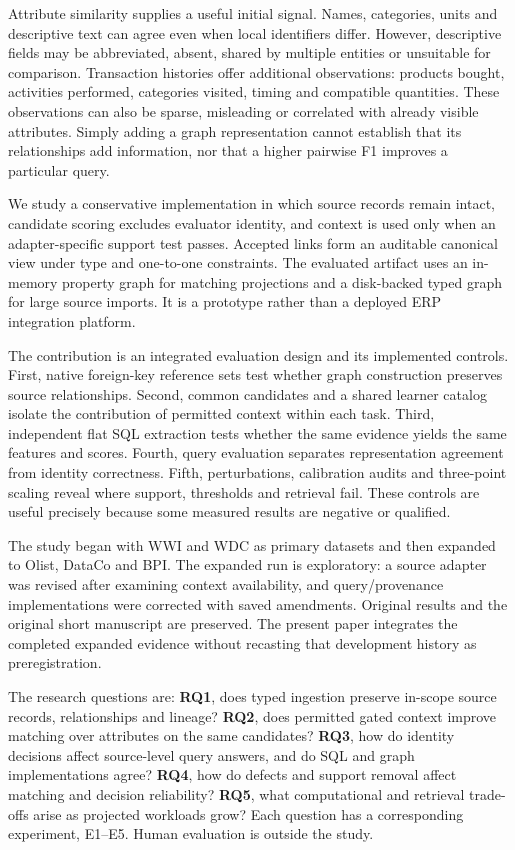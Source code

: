 \documentclass[11pt,letterpaper]{article}
\begin{document}
Attribute similarity supplies a useful initial signal. Names, categories, units and descriptive text can agree even when local identifiers differ. However, descriptive fields may be abbreviated, absent, shared by multiple entities or unsuitable for comparison. Transaction histories offer additional observations: products bought, activities performed, categories visited, timing and compatible quantities. These observations can also be sparse, misleading or correlated with already visible attributes. Simply adding a graph representation cannot establish that its relationships add information, nor that a higher pairwise F1 improves a particular query.

We study a conservative implementation in which source records remain intact, candidate scoring excludes evaluator identity, and context is used only when an adapter-specific support test passes. Accepted links form an auditable canonical view under type and one-to-one constraints. The evaluated artifact uses an in-memory property graph for matching projections and a disk-backed typed graph for large source imports. It is a prototype rather than a deployed ERP integration platform.

The contribution is an integrated evaluation design and its implemented controls. First, native foreign-key reference sets test whether graph construction preserves source relationships. Second, common candidates and a shared learner catalog isolate the contribution of permitted context within each task. Third, independent flat SQL extraction tests whether the same evidence yields the same features and scores. Fourth, query evaluation separates representation agreement from identity correctness. Fifth, perturbations, calibration audits and three-point scaling reveal where support, thresholds and retrieval fail. These controls are useful precisely because some measured results are negative or qualified.

The study began with WWI and WDC as primary datasets and then expanded to Olist, DataCo and BPI. The expanded run is exploratory: a source adapter was revised after examining context availability, and query/provenance implementations were corrected with saved amendments. Original results and the original short manuscript are preserved. The present paper integrates the completed expanded evidence without recasting that development history as preregistration.

The research questions are: \textbf{RQ1}, does typed ingestion preserve in-scope source records, relationships and lineage? \textbf{RQ2}, does permitted gated context improve matching over attributes on the same candidates? \textbf{RQ3}, how do identity decisions affect source-level query answers, and do SQL and graph implementations agree? \textbf{RQ4}, how do defects and support removal affect matching and decision reliability? \textbf{RQ5}, what computational and retrieval trade-offs arise as projected workloads grow? Each question has a corresponding experiment, E1--E5. Human evaluation is outside the study.
\end{document}
